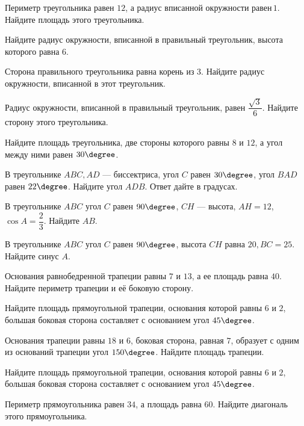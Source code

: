 \begin{class}[number=7]
\begin{listofex}
		\item Периметр треугольника равен \(12\), а радиус вписанной окружности равен \(1\). Найдите площадь этого треугольника.
		\item Найдите радиус окружности, вписанной в правильный треугольник, высота которого равна \(6\).
		\item Сторона правильного треугольника равна  корень из 3. Найдите радиус окружности, вписанной в этот треугольник.
		\item Радиус окружности, вписанной в правильный треугольник, равен \(\dfrac{\sqrt{3}}{6}\).  Найдите сторону этого треугольника.
	\end{listofex}
\end{class}

\begin{class}[number=8]
	\begin{listofex}
		\item Найдите площадь треугольника, две стороны которого равны \(8\) и \(12\), а угол между ними равен \(30 \degree \).
		\item В треугольнике \(ABC, AD\)  --- биссектриса, угол \(C\) равен \(30 \degree\), угол \(BAD\) равен \(22 \degree\). Найдите угол \(ADB\). Ответ дайте в градусах.
		\item В треугольнике \(ABC\) угол \(C\) равен \(90 \degree \), \(CH\)  --- высота, \(AH = 12\),  \(\cos A = \dfrac{2}{3} \).  Найдите \(AB\).
		\item В треугольнике \(ABC\) угол \(C\) равен \(90 \degree \), высота \(CH\) равна \(20, BC  =  25\). Найдите  синус \(A\).
		\item Основания равнобедренной трапеции равны \(7\) и \(13\), а ее площадь равна \(40\). Найдите периметр трапеции и её боковую сторону.
		\item Найдите площадь прямоугольной трапеции, основания которой равны \(6\) и \(2\), большая боковая сторона составляет с основанием угол \(45 \degree\).
		\item Основания трапеции равны \(18\) и \(6\), боковая сторона, равная \(7\), образует с одним из оснований трапеции угол \(150 \degree \). Найдите площадь трапеции.
		\item Найдите площадь прямоугольной трапеции, основания которой равны \(6\) и \(2\), большая боковая сторона составляет с основанием угол \(45 \degree \).
		\item Периметр прямоугольника равен \(34\), а площадь равна \(60\). Найдите диагональ этого прямоугольника.

\end{listofex}
\end{class}
